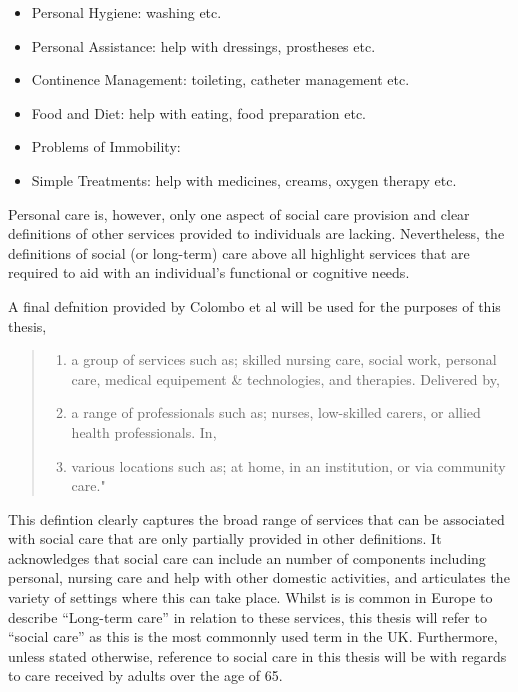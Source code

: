 \documentclass[12pt,]{report}
\begin{document}
\begin{itemize}[noitemsep]
\item Personal Hygiene: washing etc.  
\item Personal Assistance: help with dressings, prostheses etc.  
\item Continence Management: toileting, catheter management etc.  
\item Food and Diet: help with eating, food preparation etc.  
\item Problems of Immobility:  
\item Simple Treatments: help with medicines, creams, oxygen therapy etc. 
\end{itemize}

Personal care is, however, only one aspect of social care provision and
clear definitions of other services provided to individuals are lacking.
Nevertheless, the definitions of social (or long-term) care above all
highlight services that are required to aid with an individual's
functional or cognitive needs.

A final defnition provided by Colombo et al\citeyearpar{RN414} will be
used for the purposes of this thesis,

\begin{quotation}
\begin{enumerate}[noitemsep, label={\alph*)}]
\item a group of services such as; skilled nursing care, social work, personal care, medical equipement \& technologies, and therapies. Delivered by,   
\item a range of  professionals such as; nurses, low-skilled carers, or allied health professionals. In,  
\item various locations such as; at home, in an institution, or via community care."
\end{enumerate}
\end{quotation}

This defintion clearly captures the broad range of services that can be
associated with social care that are only partially provided in other
definitions. It acknowledges that social care can include an number of
components including personal, nursing care and help with other domestic
activities, and articulates the variety of settings where this can take
place. Whilst is is common in Europe to describe ``Long-term care'' in
relation to these services, this thesis will refer to ``social care'' as
this is the most commonnly used term in the UK. Furthermore, unless
stated otherwise, reference to social care in this thesis will be with
regards to care received by adults over the age of 65.
\end{document}
